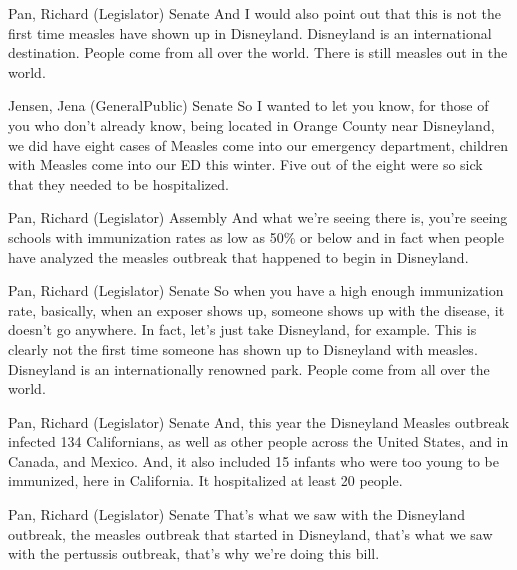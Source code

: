 \begin{result}{12.548020032233172}{Pan, Richard (Legislator) Senate}
And I would also point out that this is not the first time measles have shown up in Disneyland. Disneyland is an international destination. People come from all over the world. There is still measles out in the world.
\end{result}

\begin{result}{11.647790196985587}{Jensen, Jena (GeneralPublic) Senate}
So I wanted to let you know, for those of you who don't already know, being located in Orange County near Disneyland, we did have eight cases of Measles come into our emergency department, children with Measles come into our ED this winter. Five out of the eight were so sick that they needed to be hospitalized.
\end{result}

\begin{result}{10.309882024303807}{Pan, Richard (Legislator) Assembly}
And what we're seeing there is, you're seeing schools with immunization rates as low as 50\% or below and in fact when people have analyzed the measles outbreak that happened to begin in Disneyland.
\end{result}

\begin{result}{10.181845950621415}{Pan, Richard (Legislator) Senate}
So when you have a high enough immunization rate, basically, when an exposer shows up, someone shows up with the disease, it doesn't go anywhere. In fact, let's just take Disneyland, for example. This is clearly not the first time someone has shown up to Disneyland with measles. Disneyland is an internationally renowned park. People come from all over the world.
\end{result}

\begin{result}{9.883816091413054}{Pan, Richard (Legislator) Senate}
And, this year the Disneyland Measles outbreak infected 134 Californians, as well as other people across the United States, and in Canada, and Mexico. And, it also included 15 infants who were too young to be immunized, here in California.  It hospitalized at least 20 people.
\end{result}

\begin{result}{9.342610750665486}{Pan, Richard (Legislator) Senate}
That's what we saw with the Disneyland outbreak, the measles outbreak that started in Disneyland, that's what we saw with the pertussis outbreak, that's why we're doing this bill.
\end{result}

